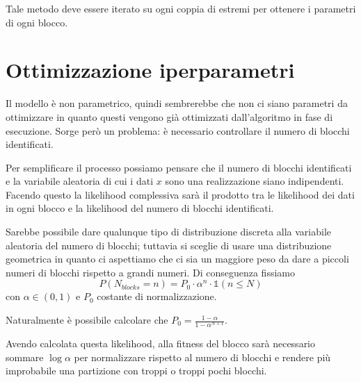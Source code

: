 \documentclass[10pt,a4paper]{report}
\begin{document}
Tale metodo deve essere iterato su ogni coppia di estremi per ottenere i parametri di ogni blocco.
\section{Ottimizzazione iperparametri}
Il modello è non parametrico, quindi sembrerebbe che non ci siano parametri da ottimizzare in quanto questi vengono già ottimizzati dall'algoritmo in fase di esecuzione. Sorge però un problema: è necessario controllare il numero di blocchi identificati.

Per semplificare il processo possiamo pensare che il numero di blocchi identificati e la variabile aleatoria di cui i dati $x$ sono una realizzazione siano indipendenti. Facendo questo la likelihood complessiva sarà il prodotto tra le likelihood dei dati in ogni blocco e la likelihood del numero di blocchi identificati.

Sarebbe possibile dare qualunque tipo di distribuzione discreta alla variabile aleatoria del numero di blocchi; tuttavia si sceglie di usare una distribuzione geometrica in quanto ci aspettiamo che ci sia un maggiore peso da dare a piccoli numeri di blocchi rispetto a grandi numeri. Di conseguenza fissiamo 
$$P(N_{blocks}=n)=P_0\cdot\alpha^n\cdot\mathds{1}(n\leq N)$$
con $\alpha\in(0,1)$ e $P_0$ costante di normalizzazione.

Naturalmente è possibile calcolare che $P_0 = \frac{1-\alpha}{1-\alpha^{N+1}}$.

Avendo calcolata questa likelihood, alla fitness del blocco sarà necessario sommare $\log\alpha$ per normalizzare rispetto al numero di blocchi e rendere più improbabile una partizione con troppi o troppi pochi blocchi.
\end{document}
